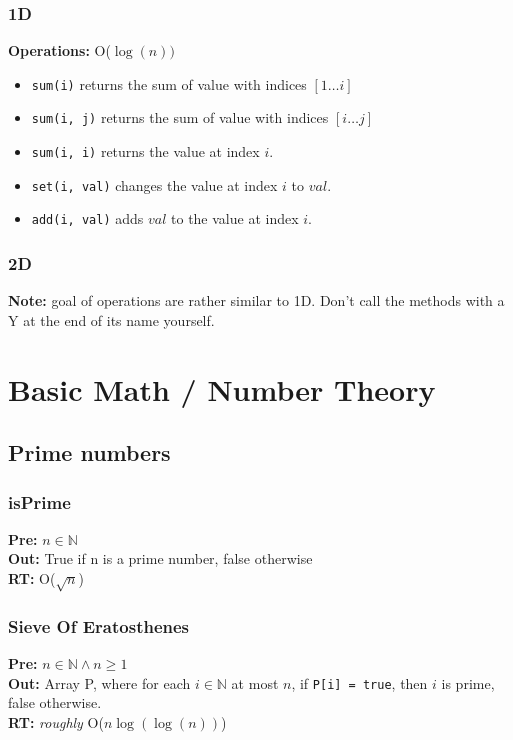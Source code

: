 \documentclass[a4paper,10pt]{article}
\newcommand{\N}{\mathbb{N}}
\begin{document}
\begin{multicols}{2}
\subsubsection{1D}
\textbf{Operations:} O($\log(n))$
\begin{itemize}[nolistsep,noitemsep]
\itemsep0em
\item \lstinline|sum(i)| returns the sum of value with indices $[1\ldots i]$
\item \lstinline|sum(i, j)| returns the sum of value with indices $[i\ldots j]$
\item \lstinline|sum(i, i)| returns the value at index $i$.
\item \lstinline|set(i, val)| changes the value at index $i$ to $val$.
\item \lstinline|add(i, val)| adds $val$ to the value at index $i$.
\end{itemize}

\subsubsection{2D}
\textbf{Note:} goal of operations are rather similar to 1D. Don't call the methods with a Y at the end of its name yourself.


\section{Basic Math / Number Theory}
\subsection{Prime numbers}
\subsubsection{isPrime}
\textbf{Pre:} $n\in\N$ \\
\textbf{Out:} True if n is a prime number, false otherwise\\
\textbf{RT:} O($\sqrt{n}$)

\subsubsection{Sieve Of Eratosthenes}
\textbf{Pre:} $n\in\N\land n\geq 1$ \\
\textbf{Out:} Array P, where for each $i\in\N$ at most $n$, if \lstinline|P[i] = true|, then $i$ is prime, false otherwise.\\
\textbf{RT:} \emph{roughly} O($n\log(\log(n))$)


\end{multicols}
\end{document}
